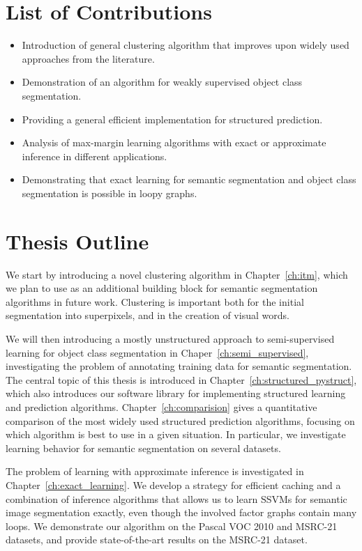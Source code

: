 \section{List of Contributions}
\begin{itemize}
\item Introduction of general clustering algorithm that improves upon widely used
    approaches from the literature.
\item Demonstration of an algorithm for  weakly supervised object class segmentation.
\item Providing a general efficient implementation for structured prediction.
\item Analysis of max-margin learning algorithms with exact or approximate inference in different applications.
\item Demonstrating that exact learning for semantic segmentation and object class segmentation is possible in loopy graphs.
\end{itemize}

\section{Thesis Outline}
We start by introducing a novel clustering algorithm in Chapter~\ref{ch:itm},
which we plan to use as an additional building block for semantic segmentation
algorithms in future work. Clustering is important both for the initial
segmentation into superpixels, and in the creation of visual words.

We will then introducing a mostly unstructured
approach to semi-supervised learning for object class segmentation in
Chaper~\ref{ch:semi_supervised}, investigating the problem of annotating
training data for semantic segmentation. The central topic of this thesis is
introduced in Chapter~\ref{ch:structured_pystruct}, which also introduces our
software library for implementing structured learning and prediction
algorithms.
Chapter~\ref{ch:comparision} gives a quantitative comparison of the most widely
used structured prediction algorithms, focusing on which algorithm is best to
use in a given situation. In particular, we investigate learning behavior for
semantic segmentation on several datasets.

The problem of learning with approximate inference is investigated in
Chapter~\ref{ch:exact_learning}.  We develop a strategy for efficient caching
and a combination of inference algorithms that allows us to learn SSVMs for
semantic image segmentation exactly, even though the involved factor graphs
contain many loops. We demonstrate our algorithm on the Pascal VOC 2010 and MSRC-21 datasets,
and provide state-of-the-art results on the MSRC-21 dataset.

